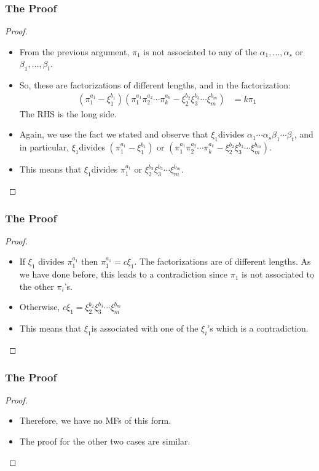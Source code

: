 \begin{frame}
  \frametitle{The Proof}
  \begin{proof}
    \begin{itemize}
      \item<1-> From the previous argument, $\pi_{1}$ is not associated to any of the $\alpha_{1},\ldots,\alpha_{s}$ or $\beta_{1},\ldots,\beta_{t}$. 
      \item<2-> So, these are factorizations of different lengths, and in the factorization:
	\begin{align*}
	  (\pi_{1}^{a_{1}}-\xi_{1}^{b_{1}})(\pi_{1}^{a_{1}}\pi_{2}^{a_{2}}\cdots\pi_{k}^{a_{k}}-\xi_{2}^{b_{2}}\xi_{3}^{b_{3}}\cdots\xi_{m}^{b_{m}}) & =k\pi_{1}
	\end{align*}
	The RHS is the long side. 
      \item<3-> Again, we use the fact we stated and observe that $\xi_{1}$divides $\alpha_{1}\cdots\alpha_{s}$$\beta_{1}\cdots\beta_{t}$, and in particular, $\xi_{1}$divides $(\pi_{1}^{a_{1}}-\xi_{1}^{b_{1}})$ or $(\pi_{1}^{a_{1}}\pi_{2}^{a_{2}}\cdots\pi_{k}^{a_{k}}-\xi_{2}^{b_{2}}\xi_{3}^{b_{3}}\cdots\xi_{m}^{b_{m}}).$
      \item<4-> This means that $\xi_{1}$divides $\pi_{1}^{a_{1}}$ or $\xi_{2}^{b_{2}}\xi_{3}^{b_{3}}\cdots\xi_{m}^{b_{m}}$.
    \end{itemize}
    \noqedsymbol
  \end{proof}
\end{frame}

\begin{frame}
  \frametitle{The Proof}
  \begin{proof}
    \begin{itemize}
      \item<1-> If $\xi_{1}$ divides $\pi_{1}^{a_{1}}$ then $\pi_{1}^{a_{1}}=c\xi_{1}$.
	The factorizations are of different lengths.
	As we have done before, this leads to a contradiction since $\pi_{1}$ is not associated to the other $\pi_{i}$'s. 
      \item<2-> Otherwise, $c\xi_{1}=\xi_{2}^{b_{2}}\xi_{3}^{b_{3}}\cdots\xi_{m}^{b_{m}}$
      \item<3-> This means that $\xi_{1}$is associated with one of the $\xi_{i}$'s which is a contradiction.
    \end{itemize}
    \noqedsymbol
  \end{proof}
\end{frame}

\begin{frame}
  \frametitle{The Proof}
  \begin{proof}
    \begin{itemize}
      \item<1-> Therefore, we have no MFs of this form.
      \item<2-> The proof for the other two cases are similar. 
    \end{itemize}
  \end{proof}
\end{frame}

